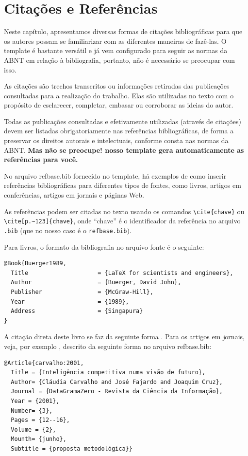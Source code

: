 \chapter{Citações e Referências}\label{referencias}
Neste capítulo, apresentamos diversas formas de citações bibliográficas para que os autores possam se familiarizar com as diferentes maneiras de fazê-las. O template é bastante versátil e já vem configurado para seguir as normas da ABNT em relação à bibliografia, portanto, não é necessário se preocupar com isso.

As citações são trechos transcritos ou informações retiradas das publicações consultadas para a realização do trabalho. Elas são utilizadas no texto com o propósito de esclarecer, completar, embasar ou corroborar as ideias do autor.

Todas as publicações consultadas e efetivamente utilizadas (através de citações) devem ser listadas obrigatoriamente nas referências bibliográficas, de forma a preservar os direitos autorais e intelectuais, conforme consta nas normas da ABNT. \textbf{Mas não se preocupe! nosso template gera automaticamente as referências para você.}

No arquivo {\ttfamily refbase.bib} fornecido no template, há exemplos de como inserir referências bibliográficas para diferentes tipos de fontes, como livros, artigos em conferências, artigos em jornais e páginas Web.

As referências podem ser citadas no texto usando os comandos \verb|\cite{chave}| ou \verb|\cite[p.~123]{chave}|, onde ``chave'' é o identificador da referência no arquivo \verb|.bib| (que no nosso caso é o \verb|refbase.bib|).

Para livros, o formato da bibliografia no arquivo fonte é o seguinte:
\begin{verbatim}
@Book{Buerger1989,
  Title                    = {LaTeX for scientists and engineers},
  Author                   = {Buerger, David John},
  Publisher                = {McGraw-Hill},
  Year                     = {1989},
  Address                  = {Singapura}
}
\end{verbatim}

A citação direta deste livro se faz da seguinte forma  \cite{Buerger1989}. Para os artigos em {\textit jornais}, veja, por exemplo \cite{carvalho:2001},
descrito da seguinte forma no arquivo {\ttfamily refbase.bib}:
\begin{verbatim}
@Article{carvalho:2001,
  Title = {Inteligência competitiva numa visão de futuro},
  Author= {Cláudia Carvalho and José Fajardo and Joaquim Cruz},
  Journal = {DataGramaZero - Revista da Ciência da Informação},
  Year = {2001},
  Number= {3},
  Pages = {12--16},
  Volume = {2},
  Mounth= {junho},
  Subtitle = {proposta metodológica}}
\end{verbatim}


